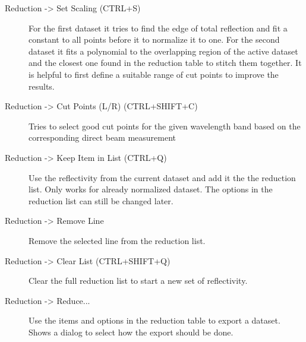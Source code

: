 \begin{description}
   \item[{ Reduction -> Set Scaling (CTRL+S)}] For the first dataset it tries to find the edge of total reflection and fit a constant to all points before it to normalize it to one. For the second dataset it fits a polynomial to the overlapping region of the active dataset and the closest one found in the reduction table to stitch them together. It is helpful to first define a suitable range of cut points to improve the results.
   \item[{ Reduction -> Cut Points (L/R) (CTRL+SHIFT+C)}] Tries to select good cut points for the given wavelength band based on the corresponding direct beam measurement
   \item[{ Reduction -> Keep Item in List (CTRL+Q)}] Use the reflectivity from the current dataset and add it the the reduction list. Only works for already normalized dataset. The options in the reduction list can still be changed later.
   \item[{ Reduction -> Remove Line}] Remove the selected line from the reduction list.
   \item[{ Reduction -> Clear List (CTRL+SHIFT+Q)}] Clear the full reduction list to start a new set of reflectivity.

    \item[{ Reduction -> Reduce...}] Use the items and options in the reduction table to export a dataset. Shows a dialog to select how the export should be done.


\end{description}
